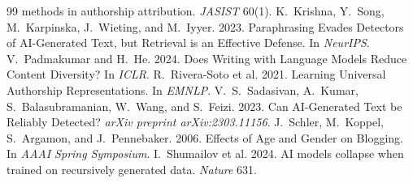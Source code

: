 \documentclass[sigconf,nonacm]{acmart}
\begin{document}
\begin{thebibliography}{99}
methods in authorship attribution. \emph{JASIST} 60(1).
 K.~Krishna, Y.~Song, M.~Karpinska, J.~Wieting, and
M.~Iyyer. 2023. Paraphrasing Evades Detectors of AI-Generated Text, but Retrieval
is an Effective Defense. In \emph{NeurIPS}.
 V.~Padmakumar and H.~He. 2024. Does Writing with
Language Models Reduce Content Diversity? In \emph{ICLR}.
 R.~Rivera-Soto et al. 2021. Learning Universal Authorship
Representations. In \emph{EMNLP}.
 V.~S.~Sadasivan, A.~Kumar, S.~Balasubramanian, W.~Wang,
and S.~Feizi. 2023. Can AI-Generated Text be Reliably Detected? \emph{arXiv preprint
arXiv:2303.11156}.
 J.~Schler, M.~Koppel, S.~Argamon, and J.~Pennebaker. 2006.
Effects of Age and Gender on Blogging. In \emph{AAAI Spring Symposium}.
 I.~Shumailov et al. 2024. AI models collapse when
trained on recursively generated data. \emph{Nature} 631.
\end{thebibliography}
\end{document}
